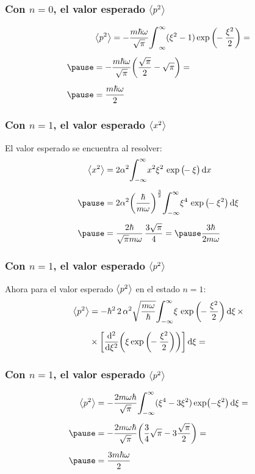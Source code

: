 \documentclass[12pt]{beamer}
\begin{document}
\begin{frame}
\frametitle{Con $n = 0$, el valor esperado $\expval{p^{2}}$}
\pause
\begin{eqnarray*}
\begin{aligned}  
&\expval{p^{2}} = - \dfrac{m \hbar \omega}{\sqrt{\pi}} \scaleint{6ex}_{\infty}^{\infty} (\xi^{2} - 1) \exp\bigg( \!\! - \dfrac{\xi^{2}}{2} \bigg) = \\[0.5em] \pause
&= - \dfrac{m \hbar \omega}{\sqrt{\pi}} \bigg( \dfrac{\sqrt{\pi}}{2} - \sqrt{\pi} \bigg) = \\[0.5em] \pause
&= \dfrac{m \hbar \omega}{2}
\end{aligned}
\end{eqnarray*}
\end{frame}
\begin{frame}
\frametitle{Con $n = 1$, el valor esperado $\expval{x^{2}}$}
El valor esperado se encuentra al resolver:
\begin{eqnarray*}
\begin{aligned}
\expval{x^{2}} &= 2 \alpha^{2} \scaleint{6ex}_{\bs -\infty}^{\infty} x^{2} \xi^{2} \, \exp\big( \!\! - \xi \big) \dd{x} \\[0.5em] \pause
&= 2 \alpha^{2} \bigg( \dfrac{\hbar}{m \omega} \bigg)^{\frac{3}{2}} \scaleint{6ex}_{\bs -\infty}^{\infty} \xi^{4} \, \exp\big( \!\! - \xi^{2} \big) \dd{\xi} \\[0.5em] \pause
&= \dfrac{2 \hbar}{\sqrt{\pi} m \omega} \, \dfrac{3 \sqrt{\pi}}{4} = \pause \dfrac{3 \hbar}{2 m \omega}
\end{aligned}
\end{eqnarray*}
\end{frame}
\begin{frame}
\frametitle{Con $n = 1$, el valor esperado $\expval{p^{2}}$}
Ahora para el valor esperado $\expval{p^{2}}$ en el estado $n = 1$:
\pause
\begin{eqnarray*}
\begin{aligned}
\expval{p^{2}} &= - \hbar^{2} \, 2 \, \alpha^{2} \sqrt{\dfrac{m \omega}{\hbar}} \scaleint{6ex}_{\bs - \infty}^{\infty} \xi \, \exp \bigg(\!\! - \dfrac{\xi^{2}}{2} \bigg) \dd{\xi} \times \\[0.5em]
&\times \bigg[ \dv[2]{\xi} (\xi \exp\bigg( \!\! - \dfrac{\xi^{2}}{2} \bigg)) \bigg] \dd{\xi} =
\end{aligned}
\end{eqnarray*}
\end{frame}
\begin{frame}
\frametitle{Con $n = 1$, el valor esperado $\expval{p^{2}}$}
\begin{eqnarray*}
\begin{aligned}
\expval{p^{2}} &= - \dfrac{2 m \omega \hbar}{\sqrt{\pi}} \scaleint{6ex}_{\bs - \infty}^{\infty} (\xi^{4} - 3 \xi^{2}) \exp (-\xi^{2}) \dd{\xi} = \\[0.5em] \pause
&= - \dfrac{2 m \omega \hbar}{\sqrt{\pi}} \bigg( \dfrac{3}{4} \sqrt{\pi} - 3 \dfrac{\sqrt{\pi}}{2} \bigg) = \\[0.5em] \pause
&= \dfrac{3 m \hbar \omega}{2}
\end{aligned}
\end{eqnarray*}
\end{frame}
\end{document}
